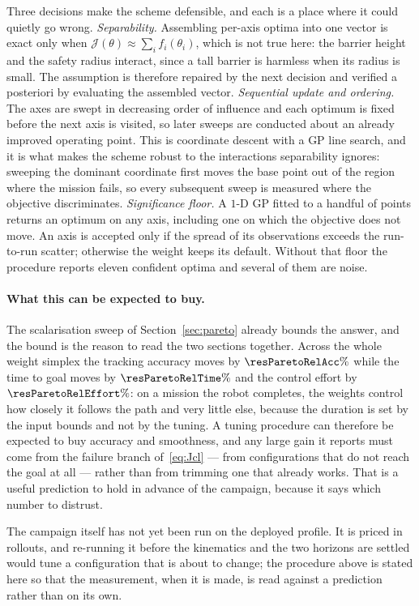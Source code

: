 \documentclass[11pt,a4paper]{article}
\begin{document}
Three decisions make the scheme defensible, and each is a place where it could quietly go wrong.
\emph{Separability.} Assembling per-axis optima into one vector is exact only when
$\mathcal{J}(\theta)\approx\sum_i f_i(\theta_i)$, which is not true here: the barrier height and the safety
radius interact, since a tall barrier is harmless when its radius is small. The assumption is therefore
repaired by the next decision and verified a posteriori by evaluating the assembled vector.
\emph{Sequential update and ordering.} The axes are swept in decreasing order of influence and each optimum
is fixed before the next axis is visited, so later sweeps are conducted about an already improved operating
point. This is coordinate descent with a GP line search, and it is what makes the scheme robust to the
interactions separability ignores: sweeping the dominant coordinate first moves the base point out of the
region where the mission fails, so every subsequent sweep is measured where the objective discriminates.
\emph{Significance floor.} A $1$-D GP fitted to a handful of points returns an optimum on any axis, including
one on which the objective does not move. An axis is accepted only if the spread of its observations exceeds
the run-to-run scatter; otherwise the weight keeps its default. Without that floor the procedure reports
eleven confident optima and several of them are noise.

\paragraph{What this can be expected to buy.} The scalarisation sweep of Section~\ref{sec:pareto} already
bounds the answer, and the bound is the reason to read the two sections together. Across the whole weight
simplex the tracking accuracy moves by $\resParetoRelAcc\%$ while the time to goal moves by
$\resParetoRelTime\%$ and the control effort by $\resParetoRelEffort\%$: on a mission the robot completes,
the weights control how closely it follows the path and very little else, because the duration is set by the
input bounds and not by the tuning. A tuning procedure can therefore be expected to buy accuracy and
smoothness, and any large gain it reports must come from the failure branch of~\eqref{eq:Jcl} --- from
configurations that do not reach the goal at all --- rather than from trimming one that already works. That
is a useful prediction to hold in advance of the campaign, because it says which number to distrust.

The campaign itself has not yet been run on the deployed profile. It is priced in rollouts, and re-running it
before the kinematics and the two horizons are settled would tune a configuration that is about to change;
the procedure above is stated here so that the measurement, when it is made, is read against a prediction
rather than on its own.
\end{document}
